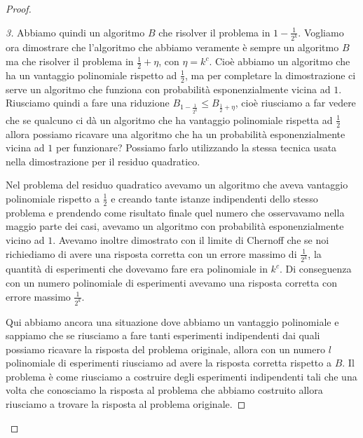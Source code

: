 \begin{proof}
\begin{proof}[3]
Abbiamo quindi un algoritmo $B$ che risolver il problema in $1 - \frac{1}{2^k}$. Vogliamo ora dimostrare che l'algoritmo che abbiamo veramente è sempre un algoritmo $B$ ma che risolver il problema in $\frac{1}{2} + \eta$, con $\eta = k^c$. Cioè abbiamo un algoritmo che ha un vantaggio polinomiale rispetto ad $\frac{1}{2}$, ma per completare la dimostrazione ci serve un algoritmo che funziona con probabilità esponenzialmente vicina ad $1$. Riusciamo quindi a fare una riduzione $B_{1 - \frac{1}{2^k}} \le B_{\frac{1}{2} + \eta}$, cioè riusciamo a far vedere che se qualcuno ci dà un algoritmo che ha vantaggio polinomiale rispetta ad $\frac{1}{2}$ allora possiamo ricavare una algoritmo che ha un probabilità esponenzialmente vicina ad $1$ per funzionare? Possiamo farlo utilizzando la stessa tecnica usata nella dimostrazione per il residuo quadratico. 

Nel problema del residuo quadratico avevamo un algoritmo che aveva vantaggio polinomiale rispetto a $\frac{1}{2}$ e creando tante istanze indipendenti dello stesso problema e prendendo come risultato finale quel numero che osservavamo nella maggio parte dei casi, avevamo un algoritmo con probabilità esponenzialmente vicino ad $1$.
Avevamo inoltre dimostrato con il limite di Chernoff che se noi richiediamo di avere una risposta corretta con un errore massimo di $\frac{1}{2^k}$, la quantità di esperimenti che dovevamo fare era polinomiale in $k^c$. Di conseguenza con un numero polinomiale di esperimenti avevamo una risposta corretta con errore massimo $\frac{1}{2^k}$.

Qui abbiamo ancora una situazione dove abbiamo un vantaggio polinomiale e sappiamo che se riusciamo a fare tanti esperimenti indipendenti dai quali possiamo ricavare la risposta del problema originale, allora con un numero $l$ polinomiale di esperimenti riusciamo ad avere la risposta corretta rispetto a $B$. Il problema è come riusciamo a costruire degli esperimenti indipendenti tali che una volta che conosciamo la risposta al problema che abbiamo costruito allora riusciamo a trovare la risposta al problema originale.


\end{proof}
\end{proof}
